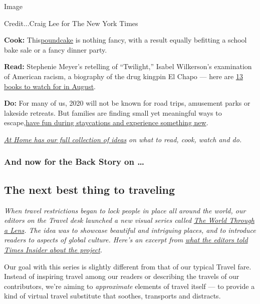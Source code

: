 Image

Credit...Craig Lee for The New York Times

\textbf{Cook:}
This\href{https://cooking.nytimes.com/recipes/12194-field-day-poundcake}{poundcake}
is nothing fancy, with a result equally befitting a school bake sale or
a fancy dinner party.

\textbf{Read:} Stephenie Meyer's retelling of ``Twilight,'' Isabel
Wilkerson's examination of American racism, a biography of the drug
kingpin El Chapo --- here are
\href{https://www.nytimes.com/2020/07/30/books/new-august-books.html?action=click\&module=RelatedLinks\&pgtype=collection}{13
books to watch for in August}.

\textbf{Do:} For many of us, 2020 will not be known for road trips,
amusement parks or lakeside retreats. But families are finding small yet
meaningful ways to
escape,\href{https://www.nytimes.com/2020/07/24/parenting/summer-staycation-coronavirus.html?action=click\&module=RelatedLinks\&pgtype=collection}{have
fun during staycations and experience something new}.

\href{https://www.nytimes.com/spotlight/at-home}{\emph{At Home has our
full collection of ideas}} \emph{on what to read, cook, watch and do.}

\hypertarget{and-now-for-the-back-story-on-}{%
\subsubsection{And now for the Back Story on
\ldots{}}\label{and-now-for-the-back-story-on-}}

\hypertarget{the-next-best-thing-to-traveling}{%
\subsection{The next best thing to
traveling}\label{the-next-best-thing-to-traveling}}

\emph{When travel restrictions began to lock people in place all around
the world, our editors on the Travel desk launched a new visual series
called}
\href{https://www.nytimes.com/column/the-world-through-a-lens}{\emph{The
World Through a Lens}}\emph{. The idea was to showcase beautiful and
intriguing places, and to introduce readers to aspects of global
culture. Here's an excerpt from}
\href{https://www.nytimes.com/2020/08/03/insider/letting-their-cameras-transport-you.html}{\emph{what
the editors told Times Insider about the project}}\emph{.}

Our goal with this series is slightly different from that of our typical
Travel fare. Instead of inspiring travel among our readers or describing
the travels of our contributors, we're aiming to \emph{approximate}
elements of travel itself --- to provide a kind of virtual travel
substitute that soothes, transports and distracts.

